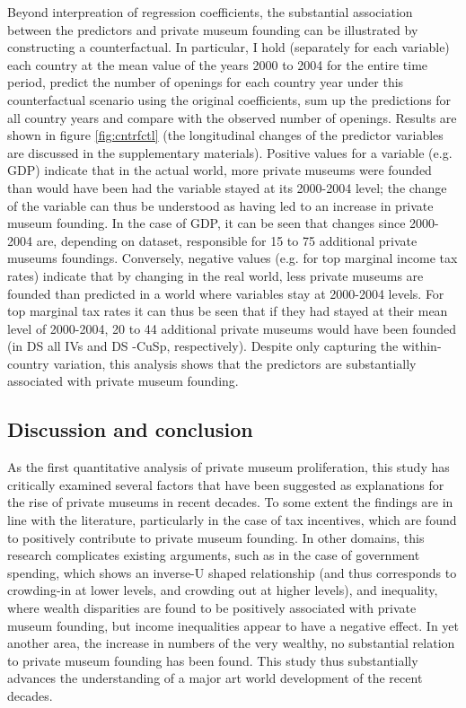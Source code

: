 \documentclass[11pt]{article}
\begin{document}
Beyond interpreation of regression coefficients, the substantial association between the predictors and private museum founding can be illustrated by constructing a counterfactual.
In particular, I hold (separately for each variable) each country at the mean value of the years 2000 to 2004 for the entire time period, predict the number of openings for each country year under this counterfactual scenario using the original coefficients, sum up the predictions for all country years and compare with the observed number of openings.
Results are shown in figure \ref{fig:cntrfctl} (the longitudinal changes of the predictor variables are discussed in the supplementary materials).
Positive values for a variable (e.g. GDP) indicate that in the actual world, more private museums were founded than would have been had the variable stayed at its 2000-2004 level; the change of the variable can thus be understood as having led to an increase in private museum founding.
In the case of GDP, it can be seen that changes since 2000-2004 are, depending on dataset, responsible for 15 to 75 additional private museums foundings.
Conversely, negative values (e.g. for top marginal income tax rates) indicate that by changing in the real world, less private museums are founded than predicted in a world where variables stay at 2000-2004 levels.
For top marginal tax rates it can thus be seen that if they had stayed at their mean level of 2000-2004, 20 to 44 additional private museums would have been founded (in DS all IVs and DS -CuSp, respectively).
Despite only capturing the within-country variation, this analysis shows that the predictors are substantially associated with private museum founding. 


\subsection*{Discussion and conclusion}

As the first quantitative analysis of private museum proliferation, this study has critically examined several factors that have been suggested as explanations for the rise of private museums in recent decades.
To some extent the findings are in line with the literature, particularly in the case of tax incentives, which are found to positively contribute to private museum founding.
In other domains, this research complicates existing arguments, such as in the case of government spending, which shows an inverse-U shaped relationship (and thus corresponds to crowding-in at lower levels, and crowding out at higher levels), and inequality, where wealth disparities are found to be positively associated with private museum founding, but income inequalities appear to have a negative effect. 
In yet another area, the increase in numbers of the very wealthy, no substantial relation to private museum founding has been found. 
This study thus substantially advances the understanding of a major art world development of the recent decades.
\end{document}
